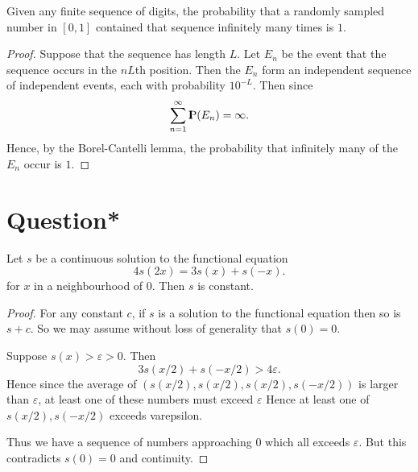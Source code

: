 \documentclass{unswmaths}
\begin{document}
\begin{theorem}
    Given any finite sequence of digits, the probability that a
    randomly sampled number in $[0,1]$
    contained that sequence infinitely many times is $1$.
\end{theorem}
\begin{proof}
    Suppose that the sequence has length $L$. Let $E_n$
    be the event that the sequence occurs in
    the $nL$th position. Then the $E_n$ form an independent sequence
    of independent events, each with probability $10^{-L}$. Then since
    \begin{equation*}
        \sum_{n=1}^\infty {\rm I\kern-.3em P}(E_n) = \infty.
    \end{equation*}
    Hence, by the Borel-Cantelli lemma, the probability that infinitely
    many of the $E_n$ occur is $1$.
\end{proof}

\section*{Question*}

\begin{lemma}
\label{firstFunctional}
    Let $s$ be a continuous solution to the functional equation
    \begin{equation*}
        4s(2x) = 3s(x)+s(-x).
    \end{equation*}
    for $x$ in a neighbourhood of $0$.
    Then $s$ is constant.
\end{lemma}
\begin{proof}
    For any constant $c$, if $s$ is a solution to the functional
    equation then so is $s+c$. So we may assume without loss
    of generality that $s(0) = 0$.
    
    Suppose $s(x) > \varepsilon > 0$. Then 
    \begin{equation*}
        3s(x/2)+s(-x/2) > 4\varepsilon. 
    \end{equation*}
    Hence since the average of $(s(x/2),s(x/2),s(x/2),s(-x/2))$
    is larger than $\varepsilon$, at least one of these numbers
    must exceed $\varepsilon$
    Hence at least one of $s(x/2),s(-x/2)$ exceeds varepsilon. 
    
    Thus we have a sequence of numbers approaching $0$ which all
    exceeds $\varepsilon$. But this contradicts $s(0) = 0$
    and continuity.
\end{proof}
\end{document}

